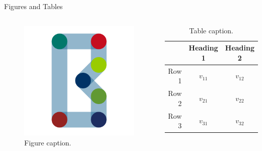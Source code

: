 \documentclass{beamer}
\begin{document}
    \begin{frame}{Figures and Tables}
        \begin{columns}
                \begin{figure}
                    \centering
                    \includegraphics[width=\linewidth]{bse.png}
                    \caption{Figure caption.}
                    \label{fig:bse_logo}
                \end{figure}
                
                \begin{table}
                    \centering
                    \begin{tabular}{rcc}
                         & Heading 1 & Heading 2 \\\hline
                        Row 1 & \(v_{11}\) & \(v_{12}\) \\
                        Row 2 & \(v_{21}\) & \(v_{22}\) \\
                        Row 3 & \(v_{31}\) & \(v_{32}\) \\
                    \end{tabular}
                    \caption{Table caption.}
                    \label{tab:demo}
                \end{table}
        \end{columns}
    \end{frame}
    
\end{document}
